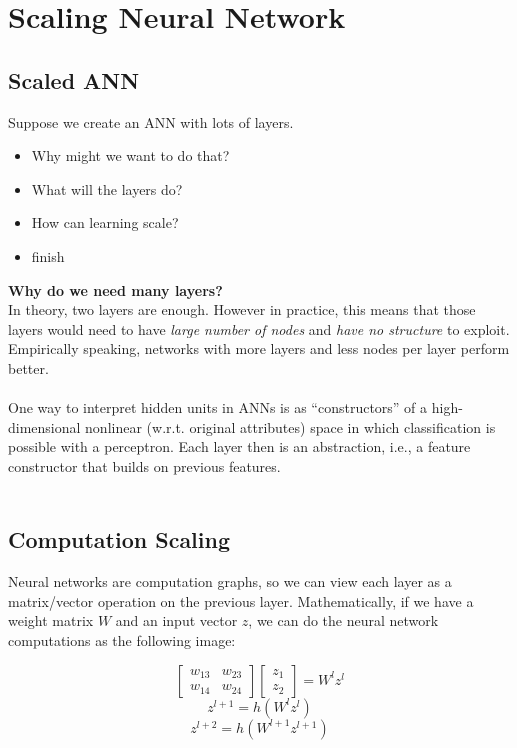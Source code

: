 \documentclass[12pt, a4paper]{book}
\begin{document}
\section{Scaling Neural Network}
\subsection{Scaled ANN}
Suppose we create an ANN with lots of layers.
\begin{itemize}
    \item Why might we want to do that?
    \item What will the layers do?
    \item How can learning scale?
    \item finish\\
\end{itemize}
\textbf{Why do we need many layers?}\\
In theory, two layers are enough. However in practice, this means that those layers would need to have \textit{large number of nodes} and \textit{have no structure} to exploit. Empirically speaking, networks with more layers and less nodes per layer perform better.\\\\
One way to interpret hidden units in ANNs is as “constructors” of a high-dimensional nonlinear (w.r.t. original attributes) space in which classification is possible with a perceptron. Each layer then is an abstraction, i.e., a feature constructor that builds on previous features.\\\\

\subsection{Computation Scaling}
Neural networks are computation graphs, so we can view each layer as a matrix/vector operation on the previous layer. Mathematically, if we have a weight matrix $W$ and an input vector $z$, we can do the neural network computations as the following image:

$$\begin{bmatrix}
    w_{13} & w_{23}\\
    w_{14} & w_{24}
\end{bmatrix}\begin{bmatrix}
    z_1\\
    z_2
\end{bmatrix} = W^lz^l$$
$$z^{l+1} = h(W^lz^l)$$
$$z^{l+2} = h(W^{l+1}z^{l+1})$$
\end{document}
